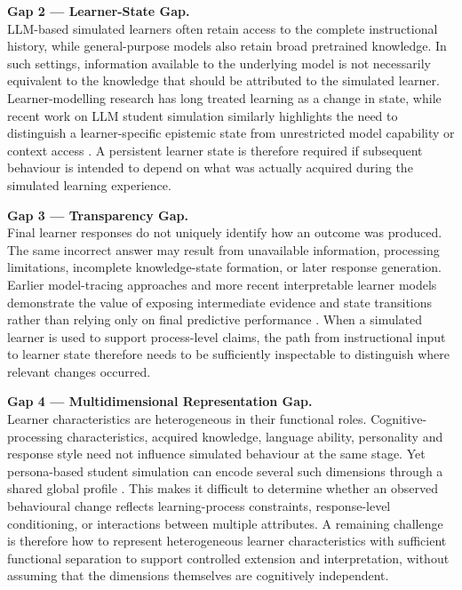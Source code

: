 \textbf{Gap 2 --- Learner-State Gap.}\\
LLM-based simulated learners often retain access to the complete instructional history, while general-purpose models also retain broad pretrained knowledge. In such settings, information available to the underlying model is not necessarily equivalent to the knowledge that should be attributed to the simulated learner. Learner-modelling research has long treated learning as a change in state, while recent work on LLM student simulation similarly highlights the need to distinguish a learner-specific epistemic state from unrestricted model capability or context access \cite{abdelrahman-etal-2023-knowledge,yuan-etal-2026-towards}. A persistent learner state is therefore required if subsequent behaviour is intended to depend on what was actually acquired during the simulated learning experience.

\textbf{Gap 3 --- Transparency Gap.}\\
Final learner responses do not uniquely identify how an outcome was produced. The same incorrect answer may result from unavailable information, processing limitations, incomplete knowledge-state formation, or later response generation. Earlier model-tracing approaches and more recent interpretable learner models demonstrate the value of exposing intermediate evidence and state transitions rather than relying only on final predictive performance \cite{anderson-etal-1995-cognitive,lu-etal-2023-interpreting}. When a simulated learner is used to support process-level claims, the path from instructional input to learner state therefore needs to be sufficiently inspectable to distinguish where relevant changes occurred.

\textbf{Gap 4 --- Multidimensional Representation Gap.}\\
Learner characteristics are heterogeneous in their functional roles. Cognitive-processing characteristics, acquired knowledge, language ability, personality and response style need not influence simulated behaviour at the same stage. Yet persona-based student simulation can encode several such dimensions through a shared global profile \cite{liu-etal-2024-personality}. This makes it difficult to determine whether an observed behavioural change reflects learning-process constraints, response-level conditioning, or interactions between multiple attributes. A remaining challenge is therefore how to represent heterogeneous learner characteristics with sufficient functional separation to support controlled extension and interpretation, without assuming that the dimensions themselves are cognitively independent.

